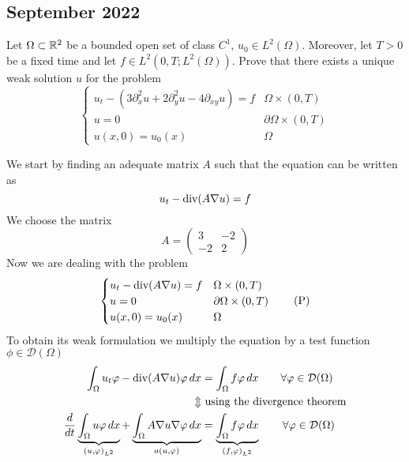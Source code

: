 \newpage
\subsection{September 2022}
\begin{exercise}
    Let \(\Omega \subset \mathbb{R}^2\) be a bounded open set of class \(C^1\), \(u_0 \in L^2(\Omega)\). Moreover, let \(T > 0\) be a fixed time and let \(f \in L^2(0, T; L^2(\Omega))\). Prove that there exists a unique weak solution \(u\) for the problem
    \[
        \begin{cases}
            u_t - \left( 3\partial_{x}^2 u + 2\partial_{y}^2 u - 4 \partial_{xy} u \right) = f & \Omega \times (0, T)         \\
            u = 0                                                                              & \partial\Omega \times (0, T) \\
            u(x, 0) = u_0(x)                                                                   & \Omega
        \end{cases}
    \]
\end{exercise}
We start by finding an adequate matrix \(A\) such that the equation can be written as
\[
    u_t - \text{div}(A \nabla u) = f
\]
We choose the matrix
\[
    A = \begin{pmatrix}
        3  & -2 \\
        -2 & 2
    \end{pmatrix}
\]
Now we are dealing with the problem
\[
    \begin{cases}
        u_t - \text{div}(A \nabla u) = f & \Omega \times (0, T)         \\
        u = 0                     & \partial\Omega \times (0, T) \\
        u(x, 0) = u_0(x)          & \Omega
    \end{cases}
    \tag*{(P)}
\]
To obtain its weak formulation we multiply the equation by a test function
\(\phi \in \mathcal{D}(\Omega)\)
\begin{align*}
    \int_\Omega u_t \varphi - \text{div}(A \nabla u) \varphi \, dx                                                                                      & = \int_\Omega f \varphi \, dx \qquad \forall \varphi \in \mathcal{D}(\Omega)                                \\
    \Updownarrow                                                                                                                           & \text{ using the divergence theorem}                                                                  \\
    \frac{d}{dt} \underbrace{\int_\Omega u \varphi \, dx}_{(u, \varphi)_{L^2}} + \underbrace{\int_\Omega A \nabla u \nabla \varphi \, dx}_{a(u,\varphi)} & = \underbrace{\int_\Omega f \varphi \, dx}_{(f, \varphi)_{L^2}} \qquad \forall \varphi \in \mathcal{D}(\Omega) \\
\end{align*}
